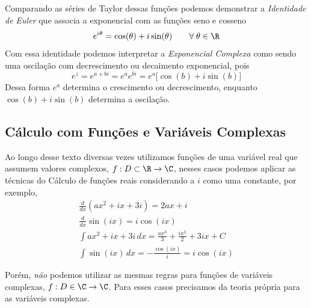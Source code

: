 Comparando as séries de Taylor dessas funções podemos demonstrar a \emph{Identidade de Euler}
que associa a exponencial com as funções seno e cosseno
\begin{equation}
  e^{i\theta} = \cos(\theta) + i\sin(\theta)  \qquad \forall \; \theta \in\R
\end{equation}
Com essa identidade podemos interpretar a \emph{Exponencial Complexa}
como sendo uma oscilação com decrescimento ou decaimento exponencial, pois
\[e^{z} = e^{a+bi} = e^a e^{bi} =e^a  \big[ \cos(b) + i\sin(b) \big] \]
Dessa forma \(e^a\) determina o crescimento ou decrescimento, enquanto
\(\cos(b) + i\sin(b)\) determina a oscilação.

\subsection*{Cálculo com Funções e Variáveis Complexas}

Ao longo desse texto diversas vezes utilizamos funções de uma variável real
que assumem valores complexos, $f:D\subset\R\to\C$, nesses casos podemos
aplicar as técnicas do Cálculo de funções reais considerando a $i$ como uma
constante, por exemplo,
\begin{gather*}
  \frac{d}{dx}\left(ax^2 + ix + 3i\right) = 2ax + i                    \\[3mm]
  \frac{d}{dx}\sin(ix) = i\cos(ix)                                     \\[5mm]
  \int ax^2 + ix + 3i \,dx = \frac{ax^3}{3} + \frac{ix^2}{2} + 3ix + C \\[3mm]
  \int \sin(ix) \,dx = -\frac{\cos(ix)}{i} = i\cos(ix)
\end{gather*}

Porém, \emph{não} podemos utilizar as mesmas regras para funções
de variáveis complexas, $f:D\in\C\to\C$. Para esses casos precisamos da
teoria própria para as variáveis complexas.

